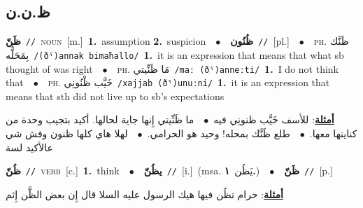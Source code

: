 \documentclass[10pt,a4paper,twoside]{article} %
\begin{document}
\begin{multicols}{2}
{{{{{\vspace{-3mm}
\subsection*{\color{blue}\foreignlanguage{arabic}{ظ.ن.ن}\color{blue}{}} 

{\setlength\topsep{0pt}\textbf{\foreignlanguage{arabic}{ظَنّ}}\ {\color{gray}\texttt{//}\color{black}}\ \textsc{noun}\ [m.]\ \textbf{1.}~assumption  \textbf{2.}~suspicion\ \ $\bullet$\ \ \setlength\topsep{0pt}\textbf{\foreignlanguage{arabic}{ظُنُون}}\ {\color{gray}\texttt{//}\color{black}}\ [pl.]\ \ $\bullet$\ \ \textsc{ph.} \color{gray} \foreignlanguage{arabic}{ظَنَّك بِمَحَلُّه}\color{black}\ {\color{gray}\texttt{/{\sffamily (ðˤ)annak bimaħallo}/}\color{black}}\ \textbf{1.}~it is an expression that means that what sb thought of was right\ \ $\bullet$\ \ \textsc{ph.} \color{gray} \foreignlanguage{arabic}{مَا ظَنِّيتي}\color{black}\ {\color{gray}\texttt{/{\sffamily maː (ðˤ)anneːti}/}\color{black}}\ \textbf{1.}~I do not think that\ \ $\bullet$\ \ \textsc{ph.} \color{gray} \foreignlanguage{arabic}{خَيَّب ظْنُونِي}\color{black}\ {\color{gray}\texttt{/{\sffamily xajjab (ðˤ)unuːni}/}\color{black}}\ \textbf{1.}~it is an expression that means that sth did not live up to sb's expectations\  \begin{flushright}\color{gray}\foreignlanguage{arabic}{\textbf{\underline{\foreignlanguage{arabic}{أمثلة}}}: للأسف خَيَّب ظنونِي فيه\ $\bullet$\ \  ما ظَنِّيتي إِنها جاية لحالها. أكيد بتجيب وحدة من كناينها معها.\ $\bullet$\ \  طلع ظَنَّك بمحله! وحيد هو الحرامي.\ $\bullet$\ \  لهلا هاي كلها ظنون وفش شي عالأكيد لسة}\end{flushright}\color{black}} \vspace{2mm}

{\setlength\topsep{0pt}\textbf{\foreignlanguage{arabic}{ظُنّ}}\ {\color{gray}\texttt{//}\color{black}}\ \textsc{verb}\ [c.]\ \textbf{1.}~think\ \ $\bullet$\ \ \setlength\topsep{0pt}\textbf{\foreignlanguage{arabic}{يظُنّ}}\ {\color{gray}\texttt{//}\color{black}}\ [i.]\ \color{gray}(msa. \foreignlanguage{arabic}{يَظُن}~\foreignlanguage{arabic}{\textbf{١.}})\color{black}\ \ $\bullet$\ \ \setlength\topsep{0pt}\textbf{\foreignlanguage{arabic}{ظَنّ}}\ {\color{gray}\texttt{//}\color{black}}\ [p.]\  \begin{flushright}\color{gray}\foreignlanguage{arabic}{\textbf{\underline{\foreignlanguage{arabic}{أمثلة}}}: حرام تظُن فيها هيك الرسول عليه السلا قال إِن بعض الظَّن إِثم}\end{flushright}\color{black}} \vspace{2mm}

}}}}}
\end{multicols}
\end{document}
